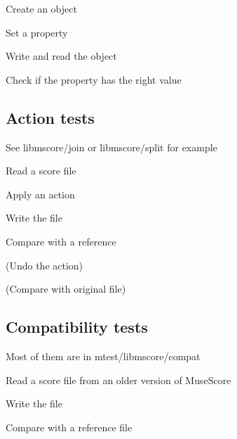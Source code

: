 \begin{DoxyItemize}
\item Create an object
\item Set a property
\item Write and read the object
\item Check if the property has the right value
\end{DoxyItemize}

\subsection*{Action tests }

See {\ttfamily libmscore/join} or {\ttfamily libmscore/split} for example


\begin{DoxyItemize}
\item Read a score file
\item Apply an action
\item Write the file
\item Compare with a reference
\item (Undo the action)
\item (Compare with original file)
\end{DoxyItemize}

\subsection*{Compatibility tests }

Most of them are in {\ttfamily mtest/libmscore/compat}


\begin{DoxyItemize}
\item Read a score file from an older version of Muse\+Score
\item Write the file
\item Compare with a reference file 
\end{DoxyItemize}